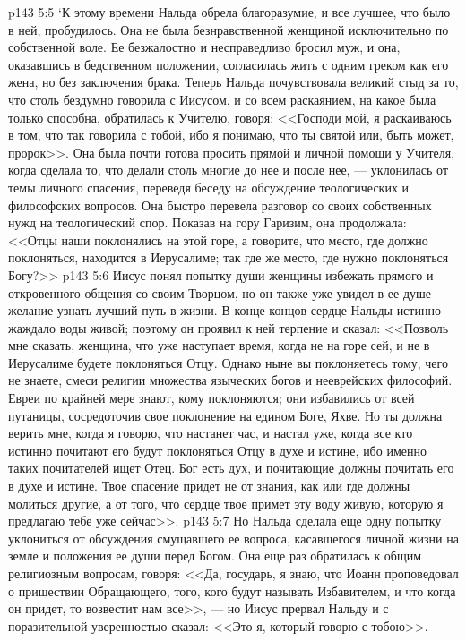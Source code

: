 \vs p143 5:5 `К этому времени Нальда обрела благоразумие, и все лучшее, что было в ней, пробудилось. Она не была безнравственной женщиной исключительно по собственной воле. Ее безжалостно и несправедливо бросил муж, и она, оказавшись в бедственном положении, согласилась жить с одним греком как его жена, но без заключения брака. Теперь Нальда почувствовала великий стыд за то, что столь бездумно говорила с Иисусом, и со всем раскаянием, на какое была только способна, обратилась к Учителю, говоря: <<Господи мой, я раскаиваюсь в том, что так говорила с тобой, ибо я понимаю, что ты святой или, быть может, пророк>>. Она была почти готова просить прямой и личной помощи у Учителя, когда сделала то, что делали столь многие до нее и после нее, --- уклонилась от темы личного спасения, переведя беседу на обсуждение теологических и философских вопросов. Она быстро перевела разговор со своих собственных нужд на теологический спор. Показав на гору Гаризим, она продолжала: <<Отцы наши поклонялись на этой горе, а  говорите, что место, где должно поклоняться, находится в Иерусалиме; так где же место, где нужно поклоняться Богу?>>
\vs p143 5:6 Иисус понял попытку души женщины избежать прямого и откровенного общения со своим Творцом, но он также уже увидел в ее душе желание узнать лучший путь в жизни. В конце концов сердце Нальды истинно жаждало воды живой; поэтому он проявил к ней терпение и сказал: <<Позволь мне сказать, женщина, что уже наступает время, когда не на горе сей, и не в Иерусалиме будете поклоняться Отцу. Однако ныне вы поклоняетесь тому, чего не знаете, смеси религии множества языческих богов и нееврейских философий. Евреи по крайней мере знают, кому поклоняются; они избавились от всей путаницы, сосредоточив свое поклонение на едином Боге, Яхве. Но ты должна верить мне, когда я говорю, что настанет час, и настал уже, когда все кто истинно почитают его будут поклоняться Отцу в духе и истине, ибо именно таких почитателей ищет Отец. Бог есть дух, и почитающие должны почитать его в духе и истине. Твое спасение придет не от знания, как или где должны молиться другие, а от того, что сердце твое примет эту воду живую, которую я предлагаю тебе уже сейчас>>.
\vs p143 5:7 Но Нальда сделала еще одну попытку уклониться от обсуждения смущавшего ее вопроса, касавшегося личной жизни на земле и положения ее души перед Богом. Она еще раз обратилась к общим религиозным вопросам, говоря: <<Да, государь, я знаю, что Иоанн проповедовал о пришествии Обращающего, того, кого будут называть Избавителем, и что когда он придет, то возвестит нам все>>, --- но Иисус прервал Нальду и с поразительной уверенностью сказал: <<Это я, который говорю с тобою>>.
